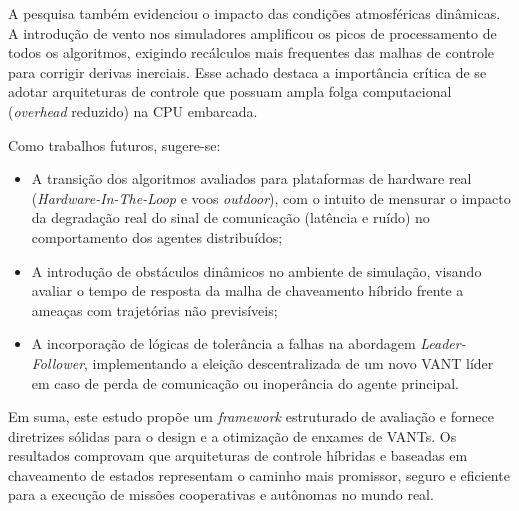 A pesquisa também evidenciou o impacto das condições atmosféricas dinâmicas. A introdução de vento nos simuladores amplificou os picos de processamento de todos os algoritmos, exigindo recálculos mais frequentes das malhas de controle para corrigir derivas inerciais. Esse achado destaca a importância crítica de se adotar arquiteturas de controle que possuam ampla folga computacional (\textit{overhead} reduzido) na CPU embarcada.

Como trabalhos futuros, sugere-se:
\begin{itemize}
    \item A transição dos algoritmos avaliados para plataformas de hardware real (\textit{Hardware-In-The-Loop} e voos \textit{outdoor}), com o intuito de mensurar o impacto da degradação real do sinal de comunicação (latência e ruído) no comportamento dos agentes distribuídos;
    \item A introdução de obstáculos dinâmicos no ambiente de simulação, visando avaliar o tempo de resposta da malha de chaveamento híbrido frente a ameaças com trajetórias não previsíveis;
    \item A incorporação de lógicas de tolerância a falhas na abordagem \textit{Leader-Follower}, implementando a eleição descentralizada de um novo VANT líder em caso de perda de comunicação ou inoperância do agente principal.
\end{itemize}

Em suma, este estudo propõe um \textit{framework} estruturado de avaliação e fornece diretrizes sólidas para o design e a otimização de enxames de VANTs. Os resultados comprovam que arquiteturas de controle híbridas e baseadas em chaveamento de estados representam o caminho mais promissor, seguro e eficiente para a execução de missões cooperativas e autônomas no mundo real.
